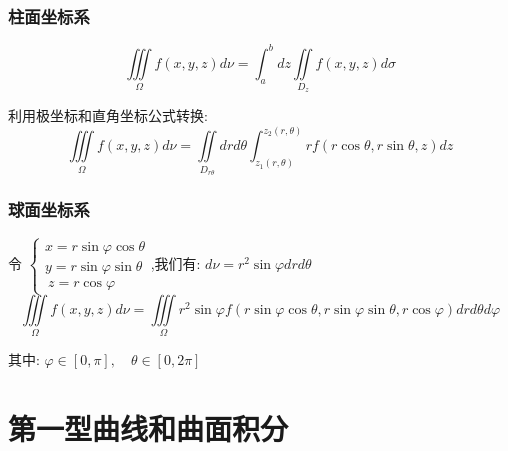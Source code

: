 \subsection{柱面坐标系}
\begin{definition}[柱坐标替换]
	$$\iiint\limits_{\Omega}f(x,y,z)d\nu=\int_{a}^{b}dz\iint\limits_{D_{z}}f(x,y,z)d\sigma$$
	
	利用极坐标和直角坐标公式转换: 
	$$\iiint\limits_{\Omega}f(x,y,z)d\nu=\iint\limits_{D_{r\theta}}drd\theta \int_{z_{1}(r,\theta)}^{z_{2}(r,\theta)}rf(r\cos \theta,r\sin\theta,z)dz$$
\end{definition}
\subsection{球面坐标系}
\begin{definition}[球面坐标替换]
	令 $\left\lbrace \begin{array}{l}
		x=r\sin\varphi\cos\theta\\
		y=r\sin\varphi\sin\theta \\\
		z=r\cos\varphi
	\end{array}\right. $,我们有: $d\nu=r^2\sin\varphi drd\theta$
	$$\iiint\limits_{\Omega}f(x,y,z)d\nu=\iiint\limits_{\Omega}r^2\sin\varphi f(r\sin\varphi\cos\theta,r\sin\varphi\sin\theta,r\cos\varphi) drd\theta d\varphi$$
	
	其中: $\varphi\in[0,\pi],\quad \theta\in[0,2\pi]$
\end{definition}
\chapter{第一型曲线和曲面积分}
